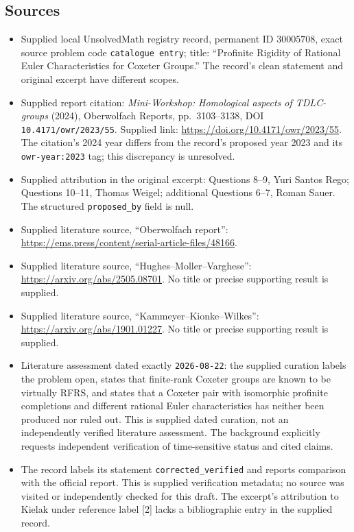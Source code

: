 \documentclass[11pt]{article}
\begin{document}
\subsection{Sources}
\begin{itemize}
\item Supplied local UnsolvedMath registry record, permanent ID \(30005708\), exact source problem code \texttt{catalogue entry}; title: ``Profinite Rigidity of Rational Euler Characteristics for Coxeter Groups.'' The record's clean statement and original excerpt have different scopes.
\item Supplied report citation: \emph{Mini-Workshop: Homological aspects of TDLC-groups} (2024), Oberwolfach Reports, pp.\ 3103--3138, DOI \texttt{10.4171/owr/2023/55}. Supplied link: \url{https://doi.org/10.4171/owr/2023/55}. The citation's 2024 year differs from the record's proposed year 2023 and its \texttt{owr-year:2023} tag; this discrepancy is unresolved.
\item Supplied attribution in the original excerpt: Questions 8--9, Yuri Santos Rego; Questions 10--11, Thomas Weigel; additional Questions 6--7, Roman Sauer. The structured \texttt{proposed\_by} field is null.
\item Supplied literature source, ``Oberwolfach report'': \url{https://ems.press/content/serial-article-files/48166}.
\item Supplied literature source, ``Hughes--Moller--Varghese'': \url{https://arxiv.org/abs/2505.08701}. No title or precise supporting result is supplied.
\item Supplied literature source, ``Kammeyer--Kionke--Wilkes'': \url{https://arxiv.org/abs/1901.01227}. No title or precise supporting result is supplied.
\item Literature assessment dated exactly \texttt{2026-08-22}: the supplied curation labels the problem open, states that finite-rank Coxeter groups are known to be virtually RFRS, and states that a Coxeter pair with isomorphic profinite completions and different rational Euler characteristics has neither been produced nor ruled out. This is supplied dated curation, not an independently verified literature assessment. The background explicitly requests independent verification of time-sensitive status and cited claims.
\item The record labels its statement \texttt{corrected\_verified} and reports comparison with the official report. This is supplied verification metadata; no source was visited or independently checked for this draft. The excerpt's attribution to Kielak under reference label [2] lacks a bibliographic entry in the supplied record.
\end{itemize}
\end{document}
